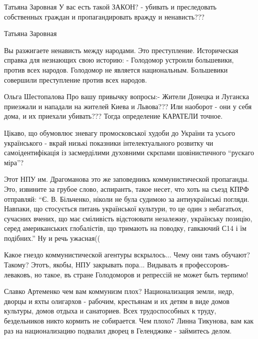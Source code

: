 \begin{itemize}
\begin{itemize}
Татьяна Заровная
У вас есть такой ЗАКОН? - убивать и преследовать собственных граждан и пропагандировать вражду и ненависть???

Татьяна Заровная

Вы разжигаете ненависть между народами. Это преступление. Историческая справка
для незнающих свою историю: - Голодомор устроили большевики, против всех
народов. Голодомор не является национальным. Большевики совершили преступление
против всех народов.


Ольга Шестопалова Про вашу привычку вопросы:- Жители Донецка и Луганска
приезжали и нападали на жителей Киева и Львова??? Или наоборот - они у себя
дома, и их приехали убивать???  Тогда определение КАРАТЕЛИ точное.
\end{itemize}


Цікаво, що обумовлює зневагу промосковської худоби до України та усього
українського - вкрай низькі показники інтелектуального розвитку чи
самоідентифікація із засмерділими духовними скрєпами шовінистичного
\enquote{рускаго міра}?


Этот НПУ им. Драгоманова это же заповедникъ коммунистической пропаганды. Это,
извините за грубое слово, аспирантъ, такое несет, что хоть на съезд КПРФ
отправляй: \enquote{Є. В. Більченко, ніколи не була судимою за антиукраїнські
погляди.  Навпаки, що стосується питань української культури, то це один з
небагатьох, сучасних вчених, що має сміливість відстоювати незалежну,
українську позицію, серед американських глобалістів, що тримають на поводку,
гавкаючий С14 і їм подібних.} Ну и речь ужасная((


Какое гнездо коммунистической агентуры вскрылось... Чему они тамъ обучают?
Такому? Этотъ, якобы, НПУ закрывать пора... Видывалъ я профессоровъ-леваковъ,
но такое, въ стране Голодоморов и репрессій не может быть терпимо!

\begin{itemize}
Славко Артеменко чем вам коммунизм плох? Национализация земли, недр, дворцы и
яхты олигархов - рабочим, крестьянам и их детям в виде домов культуры, домов
отдыха и санаториев. Всех трудоспособных к труду, бездельников никто кормить не
собирается. Чем плохо7
Линна Тикунова, вам как раз на национализацию подвалил дворец в Геленджике - займитесь делом.
\end{itemize}


\end{itemize}
